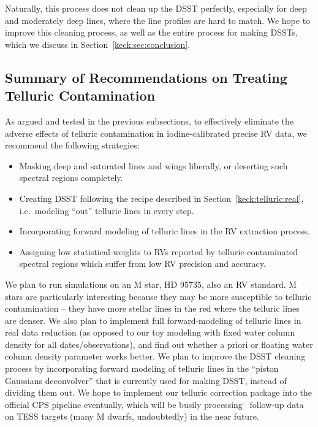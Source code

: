 Naturally, this process does not clean up the DSST perfectly,
especially for deep and moderately deep lines, where the line profiles
are hard to match. We hope to improve this cleaning process, as well
as the entire process for making DSSTs, which we discuss in
Section~\ref{keck:sec:conclusion}. 


\subsection{Summary of Recommendations on Treating Telluric
  Contamination}\label{keck:telluric:summary} 

As argued and tested in the previous subsections, to effectively
eliminate the adverse effects of telluric contamination in
iodine-calibrated precise RV data, we recommend the following
strategies:
\begin{itemize}
  \item Masking deep and saturated lines and wings liberally, or
    deserting such spectral regions completely.
  \item Creating DSST following the recipe described in
    Section~\ref{keck:telluric:real}, i.e.\ modeling ``out'' telluric
    lines in every step. 
  \item Incorporating forward modeling of telluric lines in the RV
    extraction process.
  \item Assigning low statistical weights to RVs reported by
    telluric-contaminated spectral regions which suffer from low RV
    precision and accuracy.
\end{itemize}

We plan to run simulations on an M star, HD 95735, also an RV
standard. M stars are particularly interesting because they may be
more susceptible to telluric contamination -- they have more stellar
lines in the red where the telluric lines are denser. We also plan to
implement full forward-modeling of telluric lines in real data
reduction (as opposed to our toy modeling with fixed water column
density for all dates/observations), and find out whether a priori or
floating water column density parameter works better. We plan to
improve the DSST cleaning process by incorporating forward modeling of
telluric lines in the ``piston Gaussians deconvolver'' that is
currently used for making DSST, instead of dividing them out. We hope
to implement our telluric correction package into the official CPS
pipeline eventually, which will be busily processing \keck\ follow-up
data on TESS targets (many M dwarfs, undoubtedly) in the near future.